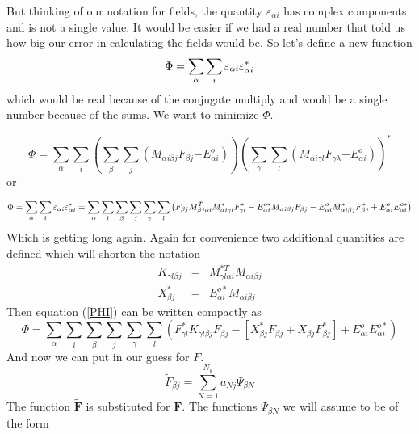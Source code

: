 \documentclass{article}
\begin{document}
But thinking of our notation for fields, the quantity $\varepsilon _{\alpha
i}$ has complex components and is not a single value. It would be easier if
we had a real number that told us how big our error in calculating the
fields would be. So let's define a new function 
\begin{equation*}
\Phi =\sum_{\alpha }\sum_{i}\mathbf{\varepsilon }_{\alpha i}\mathbf{%
\varepsilon }_{\alpha i}^{\ast }
\end{equation*}%
which would be real because of the conjugate multiply and would be a single
number because of the sums. We want to minimize $\Phi .$

\begin{equation}
\Phi =\sum_{\alpha }\sum_{i}\left( \sum_{\beta }\sum_{j}\left( M_{\alpha
i\beta j}F_{\beta j}\mathbf{-}E_{\alpha i}^{o}\right) \right) \left(
\sum_{\gamma }\sum_{l}\left( M_{\alpha i\gamma l}F_{\gamma \lambda }\mathbf{-%
}E_{\alpha i}^{o}\right) \right) ^{\ast }
\end{equation}%
or

\begin{equation}
\Phi =\sum_{\alpha }\sum_{i}\mathbf{\varepsilon }_{\alpha i}\mathbf{%
\varepsilon }_{\alpha i}^{\ast }=\sum_{\alpha }\sum_{i}\sum_{\beta
}\sum_{j}\sum_{\gamma }\sum_{l}\left( F_{\beta j}M_{\beta j\alpha
i}^{T}M_{\alpha i\gamma l}^{\ast }F_{\gamma l}^{\ast }-E_{\alpha i}^{o\ast
}M_{\alpha i\beta j}F_{\beta j}-E_{\alpha i}^{o}M_{\alpha i\beta j}^{\ast
}F_{\beta j}^{\ast }+E_{\alpha i}^{o}E_{\alpha i}^{o\ast }\right)
\label{PHI}
\end{equation}%
Which is getting long again. Again for convenience two additional quantities
are defined which will shorten the notation 
\begin{eqnarray}
K_{\gamma l\beta j} &=&M_{\gamma l\alpha i}^{\ast T}M_{\alpha i\beta j} \\
X_{\beta j}^{\ast } &=&E_{\alpha i}^{o\ast }M_{\alpha i\beta j}
\end{eqnarray}%
Then equation (\ref{PHI}) can be written compactly as 
\begin{equation}
\Phi =\sum_{\alpha }\sum_{i}\sum_{\beta }\sum_{j}\sum_{\gamma
}\sum_{l}\left( F_{\gamma l}^{\ast }K_{\gamma l\beta j}F_{\beta j}-\left[
X_{\beta j}^{\ast }F_{\beta j}+X_{\beta j}F_{\beta j}^{\ast }\right]
+E_{\alpha i}^{o}E_{\alpha i}^{o\ast }\right)
\end{equation}%
And now we can put in our guess for $F.$ 
\begin{equation}
\tilde{F}_{\beta j}\mathbf{=}\sum_{N=1}^{N_{k}}a_{Nj}\Psi _{\beta N}
\end{equation}
The function $\mathbf{\tilde{F}}$ is substituted for $\mathbf{F.}$ The
functions $\Psi _{\beta N}$ we will assume to be of the form
\end{document}
